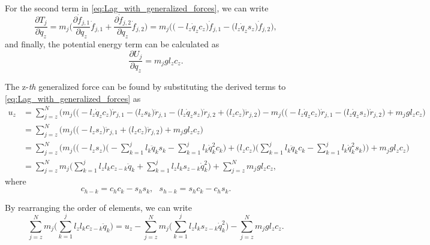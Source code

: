 \documentclass[10pt,a4paper]{article} %
\begin{document}
For the second term in \eqref{eq:Lag_with_generalized_forces}, we can write
\begin{equation}
	\frac{\partial T_j}{\partial q_z} = m_j \Big(\frac{\partial \dot{f}_{j,1}}{\partial q_z} \dot{f}_{j,1} + 
	\frac{\partial \dot{f}_{j,2}}{\partial q_z} \dot{f}_{j,2}\Big) 
	= m_j \Bigg(\Big(-l_z \dot{q}_z c_z \Big) \dot{f}_{j,1} \nonumber - \Big(l_z \dot{q}_z s_z\Big) \dot{f}_{j,2}\Bigg),
	\label{eq:lagrangian_second_term}
\end{equation}
and finally, the potential energy term can be calculated as
\begin{equation*}
	\frac{\partial U_j}{\partial q_z} = m_j g l_z c_z.
\end{equation*}

The z-\emph{th} generalized force can be found by substituting the derived terms to \eqref{eq:Lag_with_generalized_forces} as 
\begin{align*}
	u_z &= \sum_{j=z}^N \Big(m_j \Big(\Big(- l_z \dot{q}_z c_z\Big) \dot{r}_{j,1} -  \Big(l_z s_k\Big) \ddot{r}_{j,1} - \Big(l_z \dot{q}_z s_z\Big) \dot{r}_{j,2}  
	+ \Big(l_z c_z\Big) \ddot{r}_{j,2}\Big) - m_j \Big(\Big(-l_z \dot{q}_z c_z\Big)\dot{r}_{j,1} - \Big(l_z \dot{q}_z s_z\Big) \dot{r}_{j,2}\Big) 
	+ m_j g l_z c_z\Big)\\ 
	&=  \sum_{j=z}^N \Big(m_j \Big(\Big(-l_z s_z\Big) \ddot{r}_{j,1} + \Big(l_z c_z\Big) \ddot{r}_{j,2}\Big) +m_j g l_z c_z\Big)\\ 
	&= \sum_{j=z}^N \Big(m_j \Big(\Big(-l_z s_z\Big) \Big(-\sum_{k=1}^j l_k \ddot{q}_k s_k -\sum_{k=1}^j l_k \dot{q}_k^2 c_k\Big) 
	+ \Big(l_z c_z\Big) \Big(\sum_{k=1}^j l_k \ddot{q}_k c_k- \sum_{k=1}^j l_k \dot{q}_k^2 s_k\Big)\Big) +m_j g l_z c_z \Big) \\
	&= \sum_{j=z}^{N}m_j \Big( \sum_{k=1}^{j} l_z l_k c_{z-k}\ddot{q}_k + \sum_{k=1}^{j} l_z l_k s_{z-k}\dot{q}_k^2\Big) + \sum_{j=z}^{N}m_j g l_z c_z,
\end{align*}
where
\begin{equation*}
	c_{h-k} = c_hc_k-s_hs_k,  \ \ \ s_{h-k} = s_hc_k-c_hs_k.
\end{equation*}

By rearranging the order of elements, we can write
\begin{equation*}
	\sum_{j=z}^{N}m_j \Big(\sum_{k=1}^{j}l_zl_k c_{z-k}\ddot{q}_k\Big) = 
	u_z - \sum_{j=z}^{N}m_j \Big(\sum_{k=1}^{j} l_zl_k s_{z-k}\dot{q}_k^2\Big) -  \sum_{j=z}^{N}m_j g l_z c_z.
\end{equation*}
\end{document}
